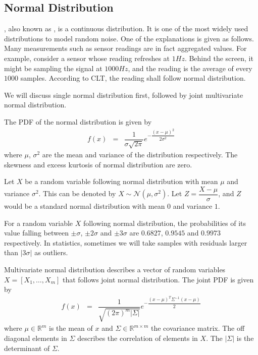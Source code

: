 \subsection{Normal Distribution}

, also known as , is a continuous distribution. It is one of the most widely used distributions to model random noise. One of the explanations is given as follows. Many measurements such as sensor readings are in fact aggregated values. For example, consider a sensor whose reading refreshes at $1Hz$. Behind the screen, it might be sampling the signal at $1000Hz$, and the reading is the average of every $1000$ samples. According to CLT, the reading shall follow normal distribution.

We will discuss single normal distribution first, followed by joint multivariate normal distribution.

The PDF of the normal distribution is given by
\begin{eqnarray}
  f(x) &=& \dfrac{1}{\sigma\sqrt{2\pi}}e^{-\dfrac{(x-\mu)^2}{2\sigma^2}} \nonumber
\end{eqnarray}
where $\mu$, $\sigma^2$ are the mean and variance of the distribution respectively. The skewness and excess kurtosis of normal distribution are zero.

Let $X$ be a random variable following normal distribution with mean $\mu$ and variance $\sigma^2$. This can be denoted by $X\sim\mathcal{N}(\mu, \sigma^2)$. Let $Z=\dfrac{X-\mu}{\sigma}$, and $Z$ would be a standard normal distribution with mean $0$ and variance $1$.

For a random variable $X$ following normal distribution, the probabilities of its value falling between $\pm \sigma$, $\pm 2\sigma$ and $\pm 3\sigma$ are $0.6827$, $0.9545$ and $0.9973$ respectively. In statistics, sometimes we will take samples with residuals larger than $|3\sigma|$ as outliers.

Multivariate normal distribution describes a vector of random variables $X = \left[X_1, \ldots, X_m\right]$ that follows joint normal distribution. The joint PDF is given by
\begin{eqnarray}
  f(x) &=& \dfrac{1}{\sqrt{(2\pi)^m|\Sigma|}}e^{-\dfrac{(x-\mu)^T\Sigma^{-1}(x-\mu)}{2}} \nonumber
\end{eqnarray}
where $\mu \in \mathbb{R}^m$ is the mean of $x$ and $\Sigma \in \mathbb{R}^{m\times m}$ the covariance matrix. The off diagonal elements in $\Sigma$ describes the correlation of elements in $X$. The $|\Sigma|$ is the determinant of $\Sigma$.

